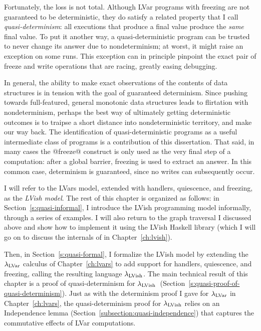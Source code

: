 Fortunately, the loss is not total.  Although LVar programs with
freezing are not guaranteed to be deterministic, they do satisfy a
related property that I call \emph{quasi-determinism}: all executions
that produce a final value produce the \emph{same} final value.  To
put it another way, a quasi-deterministic program can be trusted to
never change its answer due to nondeterminism; at worst, it might
raise an exception on some runs.  This exception can in principle
pinpoint the exact pair of freeze and write operations that are
racing, greatly easing debugging.

In general, the ability to make exact observations of the contents of
data structures is in tension with the goal of guaranteed determinism.
Since pushing towards full-featured, general monotonic data structures
leads to flirtation with nondeterminism, perhaps the best way of
ultimately getting deterministic outcomes is to traipse a short
distance into nondeterministic territory, and make our way back.  The
identification of quasi-deterministic programs as a useful
intermediate class of programs is a contribution of this dissertation.
That said, in many cases the @freeze@ construct is only used as the
very final step of a computation: after a global barrier, freezing is
used to extract an answer.  In this common case, determinism is
guaranteed, since no writes can subsequently occur.

I will refer to the LVars model, extended with handlers, quiescence,
and freezing, as the \emph{LVish model}.  The rest of this chapter is
organized as follows: in Section~\ref{s:quasi-informal}, I introduce
the LVish programming model informally, through a series of examples.
I will also return to the graph traversal I discussed above and show
how to implement it using the LVish Haskell library (which I will go
on to discuss the internals of in Chapter~\ref{ch:lvish}).

Then, in Section~\ref{s:quasi-formal}, I formalize the LVish model by
extending the $\lambda_{\textrm{LVar}}$ calculus of Chapter~\ref{ch:lvars} to add
support for handlers, quiescence, and freezing, calling the resulting
language $\lambda_{\textrm{LVish}}$.  The main technical result of this chapter is
a proof of quasi-determinism for
$\lambda_{\textrm{LVish}}$~(Section~\ref{s:quasi-proof-of-quasi-determinism}). Just
as with the determinism proof I gave for $\lambda_{\textrm{LVar}}$ in
Chapter~\ref{ch:lvars}, the quasi-determinism proof for $\lambda_{\textrm{LVish}}$
relies on an Independence lemma
(Section~\ref{subsection:quasi-independence}) that captures the
commutative effects of LVar computations.

